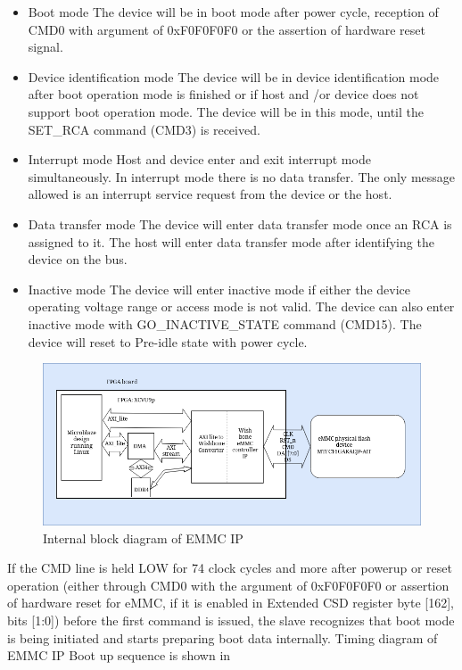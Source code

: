 \begin{itemize}
  \item {Boot mode} The device will be in boot mode after power cycle, reception of CMD0 with argument of 0xF0F0F0F0 or the assertion of hardware reset signal.

  \item {Device identification mode} The device will be in device identification mode after boot operation mode is finished or if host and /or device does not support boot operation mode. The device will be in this mode, until the SET\_RCA command (CMD3) is received.

  \item {Interrupt mode} Host and device enter and exit interrupt mode simultaneously. In interrupt mode there is no data transfer. The only message allowed is an interrupt service request from the device or the host.

  \item {Data transfer mode} The device will enter data transfer mode once an RCA is assigned to it. The host will enter data transfer mode after identifying the device on the bus.

  \item {Inactive mode} The device will enter inactive mode if either the device operating voltage range or access mode is not valid. The device can also enter inactive mode with GO\_INACTIVE\_STATE command (CMD15). The device will reset to Pre-idle state with power cycle.
\end{itemize}

\begin{figure}[H]
\begin{center}
\includegraphics[width=\textwidth]{images/emmc.png}
\caption{Internal block diagram of EMMC IP}
\label{emmc}
\end{center}
\end{figure}
If the CMD line is held LOW for 74 clock cycles and more after powerup or reset operation (either through CMD0 with the argument of 0xF0F0F0F0 or assertion of hardware reset for eMMC, if it is enabled in Extended CSD register byte [162], bits [1:0]) before the first command is issued, the slave recognizes that boot mode is being initiated and starts preparing boot data internally. Timing diagram of EMMC IP Boot up sequence is shown in 

